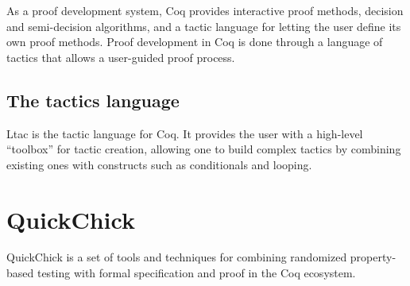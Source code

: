 As a proof development system, Coq provides interactive proof methods, decision and semi-decision algorithms, and a tactic language for letting the user define its own proof methods. Proof development in Coq is done through a language of tactics that allows a user-guided proof process.

\subsection{The tactics language}

Ltac is the tactic language for Coq. It provides the user with a high-level “toolbox” for tactic creation, allowing one to build complex tactics by combining existing ones with constructs such as conditionals and looping.

\section{QuickChick}
\label{section:quickchick}

QuickChick is a set of tools and techniques for combining randomized property-based testing with formal specification and proof in the Coq ecosystem.